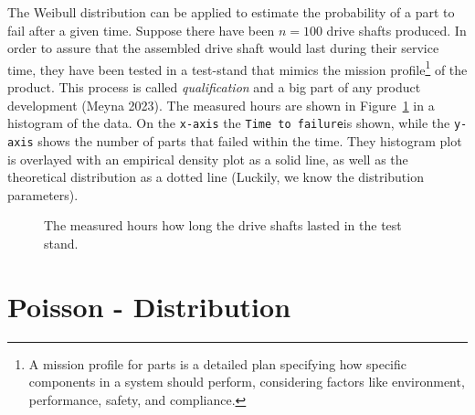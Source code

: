 \documentclass[
  a4paper,
]{scrbook}
\begin{document}
The Weibull distribution can be applied to estimate the probability of a
part to fail after a given time. Suppose there have been \(n=100\) drive
shafts produced. In order to assure that the assembled drive shaft would
last during their service time, they have been tested in a test-stand
that mimics the mission profile\footnote{A mission profile for parts is
  a detailed plan specifying how specific components in a system should
  perform, considering factors like environment, performance, safety,
  and compliance.} of the product. This process is called
\emph{qualification} and a big part of any product development (Meyna
2023). The measured hours are shown in Figure~\ref{fig-ds-wbll} in a
histogram of the data. On the \texttt{x-axis} the
\texttt{Time\ to\ failure}is shown, while the \texttt{y-axis} shows the
number of parts that failed within the time. They histogram plot is
overlayed with an empirical density plot as a solid line, as well as the
theoretical distribution as a dotted line (Luckily, we know the
distribution parameters).

\begin{figure}[ht]


\caption{\label{fig-ds-wbll}The measured hours how long the drive shafts
lasted in the test stand.}

\end{figure}%

\section{Poisson - Distribution}\label{poisson---distribution}
\end{document}
